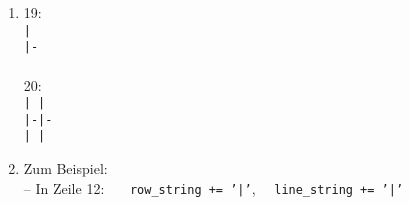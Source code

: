 \begin{enumerate}
	\item 19:\\
	\texttt{| }\\
		\texttt{|-}\\~\\
		20:\\
		\texttt{| | }\\
		\texttt{|-|-}\\
		\texttt{| | }\\
	\item Zum Beispiel:
	\\-- In Zeile 12: ~~~\texttt{row\_string += '|'},~~ \texttt{line\_string += '|'} 
\end{enumerate}